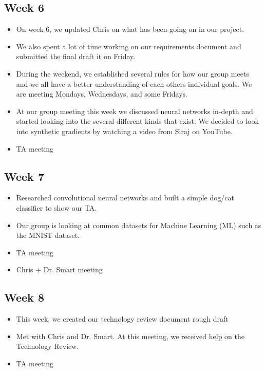 \documentclass[draftclsnofoot, onecolumn, 10pt, compsoc]{IEEEtran}
\begin{document}
\subsection{Week 6}
  \begin{itemize}
      \item On week 6, we updated Chris on what has been going on in our project. 
      \item We also spent a lot of time working on our requirements document and submitted the final draft it on Friday. 
      \item During the weekend, we established several rules for how our group meets and we all have a better understanding of each others individual goals. We are meeting Mondays, Wednesdays, and some Fridays. 
      \item At our group meeting this week we discussed neural networks in-depth and started looking into the several different kinds that exist. We decided to look into synthetic gradients by watching a video from  Siraj on YouTube.
      \item TA meeting
  \end{itemize}
  
\subsection{Week 7}
  \begin{itemize}
      \item Researched convolutional neural networks and built a simple dog/cat classifier to show our TA. 
      \item Our group is looking at common datasets for Machine Learning (ML) such as the MNIST dataset. 
      \item TA meeting
      \item Chris + Dr. Smart meeting
  \end{itemize}
  
\subsection{Week 8}
  \begin{itemize}
      \item This week, we created our technology review document rough draft
      \item Met with Chris and Dr. Smart. At this meeting, we received help on the Technology Review. 
       \item TA meeting
  \end{itemize}
  
\end{document}
